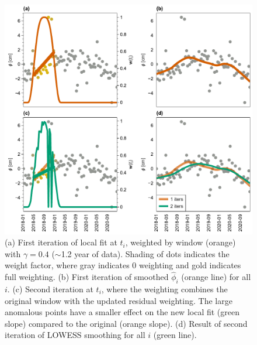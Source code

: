 \begin{figure}
	\centering
	\includegraphics[width=.99\textwidth]{figures/chapter5-lowess/figure3-fits.pdf}
	\caption[Demo of LOWESS fitting]{
		(a) First iteration of local fit at $t_i$, weighted by window (orange) with $ \gamma=0.4 $ ($ \sim $1.2 year of data). Shading of dots indicates the weight factor, where gray indicates 0 weighting and gold indicates full weighting.
		(b) First iteration of smoothed $ \hat{\phi}_i $ (orange line) for all $i$. 
		(c) Second iteration at $t_i$, where the weighting combines the original window with the updated residual weighting. The large anomalous points have a smaller effect on the new local fit (green slope) compared to the original (orange slope).
		(d) Result of second iteration of LOWESS smoothing for all $i$ (green line).
	}
	\label{fig:ch5-algo-demo}
\end{figure}

\FloatBarrier



